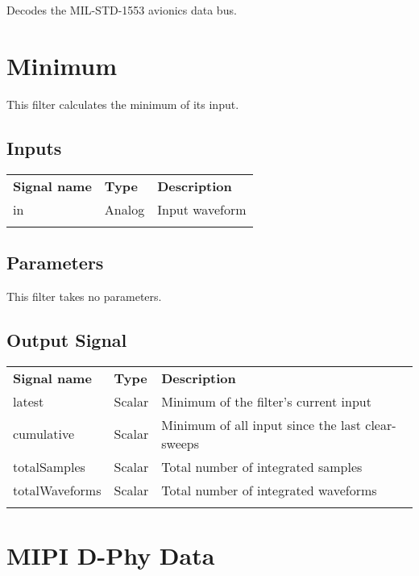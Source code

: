 Decodes the MIL-STD-1553 avionics data bus.

\pagebreak
\section{Minimum}
\label{filter:minimum}

This filter calculates the minimum of its input.

\subsection{Inputs}
\begin{tabularx}{16cm}{llX}
\thickhline
\textbf{Signal name} & \textbf{Type} & \textbf{Description} \\
\thickhline
in & Analog & Input waveform \\
\thickhline
\end{tabularx}

\subsection{Parameters}

This filter takes no parameters.

\subsection{Output Signal}

\begin{tabularx}{16cm}{llX}
\thickhline
\textbf{Signal name} & \textbf{Type} & \textbf{Description} \\
\thickhline
latest & Scalar & Minimum of the filter's current input \\
\thinhline
cumulative & Scalar & Minimum of all input since the last clear-sweeps\\
\thinhline
totalSamples & Scalar & Total number of integrated samples \\
\thinhline
totalWaveforms & Scalar & Total number of integrated waveforms \\
\thickhline
\end{tabularx}

\pagebreak
\section{MIPI D-Phy Data}
\label{filter:dphydata}


